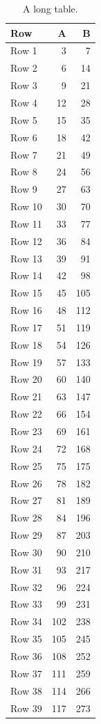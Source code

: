 \documentclass{article}
\begin{document}
\begin{longtable}{lrr}
\caption{A long table.}\\
\toprule Row & A & B \\\midrule\endhead
  Row 1 & 3 & 7 \\
  Row 2 & 6 & 14 \\
  Row 3 & 9 & 21 \\
  Row 4 & 12 & 28 \\
  Row 5 & 15 & 35 \\
  Row 6 & 18 & 42 \\
  Row 7 & 21 & 49 \\
  Row 8 & 24 & 56 \\
  Row 9 & 27 & 63 \\
  Row 10 & 30 & 70 \\
  Row 11 & 33 & 77 \\
  Row 12 & 36 & 84 \\
  Row 13 & 39 & 91 \\
  Row 14 & 42 & 98 \\
  Row 15 & 45 & 105 \\
  Row 16 & 48 & 112 \\
  Row 17 & 51 & 119 \\
  Row 18 & 54 & 126 \\
  Row 19 & 57 & 133 \\
  Row 20 & 60 & 140 \\
  Row 21 & 63 & 147 \\
  Row 22 & 66 & 154 \\
  Row 23 & 69 & 161 \\
  Row 24 & 72 & 168 \\
  Row 25 & 75 & 175 \\
  Row 26 & 78 & 182 \\
  Row 27 & 81 & 189 \\
  Row 28 & 84 & 196 \\
  Row 29 & 87 & 203 \\
  Row 30 & 90 & 210 \\
  Row 31 & 93 & 217 \\
  Row 32 & 96 & 224 \\
  Row 33 & 99 & 231 \\
  Row 34 & 102 & 238 \\
  Row 35 & 105 & 245 \\
  Row 36 & 108 & 252 \\
  Row 37 & 111 & 259 \\
  Row 38 & 114 & 266 \\
  Row 39 & 117 & 273 \\

\end{longtable}
\end{document}
